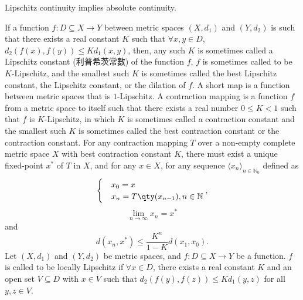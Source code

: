 \documentclass[a4paper,12pt]{report}
\begin{document}
\begin{itemize}
\begin{itemize}
Lipschitz continuity implies absolute continuity.

If a function $f\colon D\subseteq X\to Y$ between metric spaces $(X,d_1)$ and $(Y,d_2)$ is such that there exists a real constant $K$ such that $\forall x,y\in D$, $d_{2}(f(x),f(y))\leq Kd_{1}(x,y)$, then, any such $K$ is sometimes called a Lipschitz constant (利普希茨常數) of the function $f$, $f$ is sometimes called to be $K$-Lipschitz, and the smallest such $K$ is sometimes called the best Lipschitz constant, the Lipschitz constant, or the dilation of $f$.
A short map is a function between metric spaces that is $1$-Lipschitz.
A contraction mapping is a function $f$ from a metric space to itself such that there exists a real number $0\leq K<1$ such that $f$ is $K$-Lipschitz, in which $K$ is sometimes called a contraction constant and the smallest such $K$ is sometimes called the best contraction constant or the contraction constant.
For any contraction mapping $T$ over a non-empty complete metric space $X$ with best contraction constant $K$, there must exist a unique fixed-point $x^*$ of $T$ in $X$, and for any $x\in X$, for any sequence $\langle x_n\rangle_{n\in \mathbb {N}_0}$ defined as
\[\begin{cases}
&x_0=x\\
&x_n=T\qty(x_{n-1}),n\in\mathbb{N}
\end{cases},\]
\[\lim_{n\to \infty }x_{n}=x^{*}\]
and
\[d(x_n,x^*)\leq\frac{K^n}{1-K}d(x_1,x_0).\]
Let $(X,d_1)$ and $(Y,d_2)$ be metric spaces, and $f\colon D\subseteq X\to Y$ be a function. $f$ is called to be locally Lipschitz if $\forall x\in D$, there exists a real constant $K$ and an open set $V\subseteq D$ with $x\in V$ such that $d_{2}(f(y),f(z))\leq Kd_{1}(y,z)$ for all $y,z\in V$.


\end{itemize}
\end{itemize}
\end{document}
